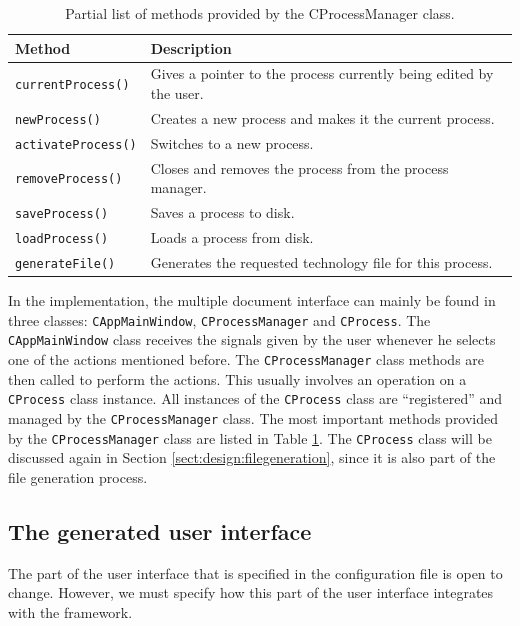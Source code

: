 \begin{table}[b] \begin{center}
\caption{Partial list of methods provided by the CProcessManager class.}
\label{tab:design:CProcessManager}
\begin{tabular}{l|p{6cm}}
\hline
 \textsf{Method}   & \textsf{Description}                                               \\
\hline
 \verb=currentProcess()=  & Gives a pointer to the process currently being edited by the user. \\
 \verb=newProcess()=      & Creates a new process and makes it the current process.            \\
 \verb=activateProcess()= & Switches to a new process.                                         \\
 \verb=removeProcess()=   & Closes and removes the process from the process manager.           \\
 \verb=saveProcess()=     & Saves a process to disk.                                           \\
 \verb=loadProcess()=     & Loads a process from disk.                                         \\
 \verb=generateFile()=    & Generates the requested technology file for this process.          \\
\hline
\end{tabular}
\end{center} \end{table}

In the implementation, the multiple document interface can mainly be found in
three classes: \verb=CAppMainWindow=, \verb=CProcessManager= and
\verb=CProcess=. The \linebreak \verb=CAppMainWindow= class receives the
signals given by the user whenever he selects one of the actions mentioned
before. The \verb=CProcessManager= class methods are then called to perform the
actions. This usually involves an operation on a \verb=CProcess= class
instance. All instances of the \verb=CProcess= class are ``registered'' and
managed by the \verb=CProcessManager= class. The most important methods
provided by the \verb=CProcessManager= class are listed in Table
\ref{tab:design:CProcessManager}. The \verb=CProcess= class will be discussed
again in Section \ref{sect:design:filegeneration}, since it is also part of the
file generation process.


\subsection{The generated user interface} \label{sect:design:generatedui}
\suppressfloats[t] The part of the user interface that is specified in the
configuration file is open to change. However, we must specify how this part of
the user interface integrates with the framework.

